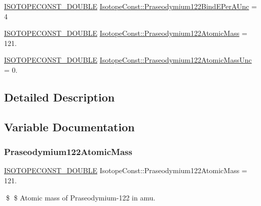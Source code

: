 \begin{DoxyCompactItemize}
\item 
\mbox{\hyperlink{group___isotope_const-_macros_ga8f45a7272ce02c0b4c65c44636ed719a}{I\+S\+O\+T\+O\+P\+E\+C\+O\+N\+S\+T\+\_\+\+D\+O\+U\+B\+LE}} \mbox{\hyperlink{group___isotope_const-_praseodymium-_pr122_ga4efa71fb6d4332ed43984c1b478f9c1d}{Isotope\+Const\+::\+Praseodymium122\+Bind\+E\+Per\+A\+Unc}} = 4
\item 
\mbox{\hyperlink{group___isotope_const-_macros_ga8f45a7272ce02c0b4c65c44636ed719a}{I\+S\+O\+T\+O\+P\+E\+C\+O\+N\+S\+T\+\_\+\+D\+O\+U\+B\+LE}} \mbox{\hyperlink{group___isotope_const-_praseodymium-_pr122_gade2576b6fe8392ea500a635491cbdad7}{Isotope\+Const\+::\+Praseodymium122\+Atomic\+Mass}} = 121.
\item 
\mbox{\hyperlink{group___isotope_const-_macros_ga8f45a7272ce02c0b4c65c44636ed719a}{I\+S\+O\+T\+O\+P\+E\+C\+O\+N\+S\+T\+\_\+\+D\+O\+U\+B\+LE}} \mbox{\hyperlink{group___isotope_const-_praseodymium-_pr122_ga07214f26f82b1f40449155670508c0c2}{Isotope\+Const\+::\+Praseodymium122\+Atomic\+Mass\+Unc}} = 0.
\end{DoxyCompactItemize}


\subsection{Detailed Description}


\subsection{Variable Documentation}
\mbox{\label{group___isotope_const-_praseodymium-_pr122_gade2576b6fe8392ea500a635491cbdad7}} 
\subsubsection{\texorpdfstring{Praseodymium122\+Atomic\+Mass}{Praseodymium122AtomicMass}}
{\footnotesize\ttfamily \mbox{\hyperlink{group___isotope_const-_macros_ga8f45a7272ce02c0b4c65c44636ed719a}{I\+S\+O\+T\+O\+P\+E\+C\+O\+N\+S\+T\+\_\+\+D\+O\+U\+B\+LE}} Isotope\+Const\+::\+Praseodymium122\+Atomic\+Mass = 121.}

\$ \$ Atomic mass of Praseodymium-\/122 in amu. \mbox{\label{group___isotope_const-_praseodymium-_pr122_ga07214f26f82b1f40449155670508c0c2}} 
